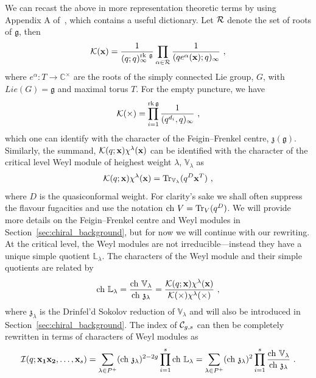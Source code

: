 \documentclass[a4paper]{article}
\def\IC{\mathbb{C}}
\def\IV{\mathbb{V}}
\def\IL{\mathbb{L}}
\def\CC{{\cal C}}
\def\II{{\cal I}}
\def\KK{{\cal K}}
\def\RR{{\cal R}}
\def\Tr{\mathop{\mathrm{Tr}}\nolimits}
\def\ch{{\rm ch}}
\def\gf{\mathfrak{g}}
\def \zf{\mathfrak{z}}
\def \rk{\mathrm{rk}}
\begin{document}
We can recast the above in more representation theoretic terms by using Appendix A of~\cite{Lemos:2014lua}, which contains a useful dictionary. Let $\RR$ denote the set of roots of $\gf$, then
\begin{equation}
	\KK(\mathbf{x}) = \frac{1}{(q;q)_\infty^{\rk~\gf}}\prod_{\alpha\in\RR} \frac{1}{(qe^{ \alpha}(\mathbf{x});q)_\infty}~,
\end{equation}
where $e^{\alpha}:T\rightarrow \IC^\times$ are the roots of the simply connected Lie group, $G$, with $Lie(G)=\gf$ and maximal torus $T$. For the empty puncture, we have
\begin{equation}
	\KK(\times) = \prod_{i=1}^{\rk\,\gf} \frac{1}{(q^{d_i},q)_{\infty}}~,
\end{equation}
which one can identify with the character of the Feigin--Frenkel centre, $\zf(\gf)$. Similarly, the summand, $\KK(q;\mathbf{x})\chi^\lambda(\mathbf{x})$ can be identified with the character of the critical level Weyl module of heighest weight $\lambda$, $\IV_{\lambda}$ as
\begin{equation}
	\KK(q;\mathbf{x})\chi^\lambda(\mathbf{x}) = \Tr_{\IV_\lambda}(q^{D} \mathbf{x}^T)~,
\end{equation}
where $D$ is the quasiconformal weight. For clarity's sake we shall often suppress the flavour fugacities and use the notation $\ch~ V = \Tr_V(q^D)$. We will provide more details on the Feigin--Frenkel centre and Weyl modules in Section~\ref{sec:chiral_background}, but for now we will continue with our rewriting. At the critical level, the Weyl modules are not irreducible---instead they have a unique simple quotient $\IL_\lambda$. The characters of the Weyl module and their simple quotients are related by
\begin{equation}
    \ch~ \IL_\lambda = \frac{ \ch~\IV_{\lambda}}{\ch~\zf_\lambda} = \frac{\KK(q;\mathbf{x}) \chi^\lambda(\mathbf{x})}{\KK(\times)\chi^\lambda(\times)}~,
\end{equation}
where $\zf_\lambda$ is the Drinfel'd Sokolov reduction of $\IV_\lambda$ and will also be introduced in Section~\ref{sec:chiral_background}. The index of $\CC_{g,s}$ can then be completely rewritten in terms of characters of Weyl modules as
\begin{equation}
	\II(q;\mathbf{x_1}\mathbf{x_2},\dots,\mathbf{x}_s) = \sum_{\lambda\in P^+} (\ch~\zf_\lambda)^{2-2g} \prod_{i=1}^{s} \ch~\IL_\lambda = \sum_{\lambda\in P^+}(\ch~\zf_\lambda)^2 \prod_{i=1}^s \frac{\ch~\IV_\lambda}{\ch~\zf_\lambda}~.
\end{equation}
\end{document}
